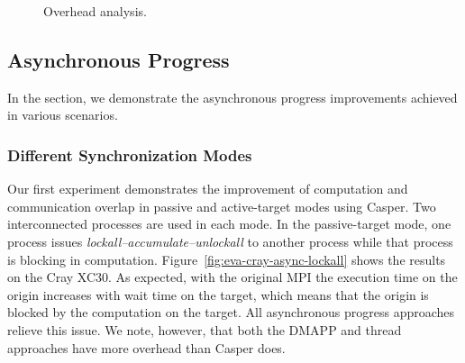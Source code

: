 \begin{figure}
\caption{Overhead analysis.}
\label{fig:eva-cray-overh}
\end{figure}


\subsection{Asynchronous Progress }\label{sec:eva-scala}

In the section, we demonstrate the asynchronous progress improvements
achieved in various scenarios.

\subsubsection{Different Synchronization Modes}\label{sec:eva-overlap}

Our first experiment demonstrates the improvement of computation and
communication overlap in passive and active-target modes using Casper.
Two interconnected processes are used in each mode.  In
the passive-target mode, one process issues
\emph{lockall--accumulate--unlockall} to another process while that
process is blocking in computation.
Figure~\ref{fig:eva-cray-async-lockall} shows the results on
the Cray XC30.  As expected, with the original MPI the execution time
on the origin increases with wait time on the target, which means that the
origin is blocked by the computation on the target.  All asynchronous
progress approaches relieve this issue.  We note, however, that both
the DMAPP and thread approaches have more overhead than Casper does.

